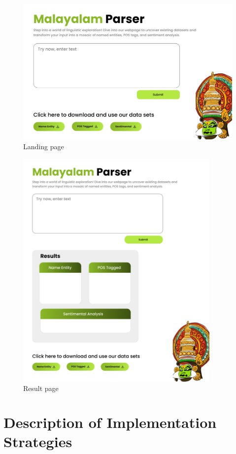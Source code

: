 \documentclass[12pt,a4paper,titlepage]{report}
\begin{document}
	\begin{figure}[H]
		\centering
		\includegraphics[width=12cm]{./LandingPage.png}
		\caption{Landing page}
	\end{figure}
	
	\begin{figure}[H]
		\centering
		\includegraphics[width=10cm]{./Result.png}
		\caption{Result page}
	\end{figure}
	
	
	
	
	
	\section{Description of Implementation Strategies}
\end{document}
